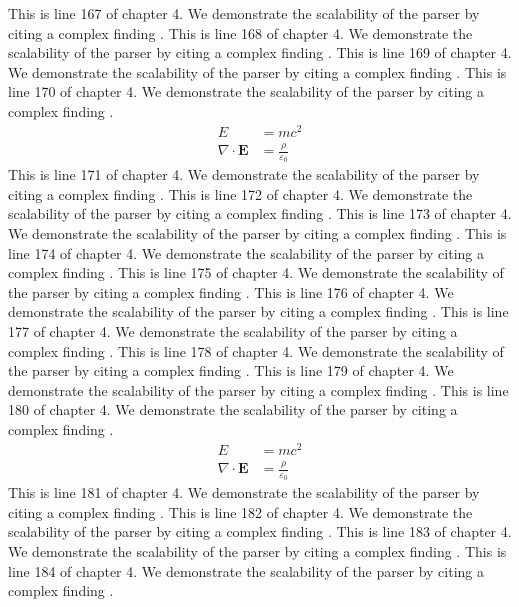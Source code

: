 This is line 167 of chapter 4. We demonstrate the scalability of the parser by citing a complex finding \cite{ref4_167}.
This is line 168 of chapter 4. We demonstrate the scalability of the parser by citing a complex finding \cite{ref4_168}.
This is line 169 of chapter 4. We demonstrate the scalability of the parser by citing a complex finding \cite{ref4_169}.
This is line 170 of chapter 4. We demonstrate the scalability of the parser by citing a complex finding \cite{ref4_170}.
\begin{align*}
  E &= mc^2 \\
  \nabla \cdot \mathbf{E} &= \frac{\rho}{\varepsilon_0}
\end{align*}
This is line 171 of chapter 4. We demonstrate the scalability of the parser by citing a complex finding \cite{ref4_171}.
This is line 172 of chapter 4. We demonstrate the scalability of the parser by citing a complex finding \cite{ref4_172}.
This is line 173 of chapter 4. We demonstrate the scalability of the parser by citing a complex finding \cite{ref4_173}.
This is line 174 of chapter 4. We demonstrate the scalability of the parser by citing a complex finding \cite{ref4_174}.
This is line 175 of chapter 4. We demonstrate the scalability of the parser by citing a complex finding \cite{ref4_175}.
This is line 176 of chapter 4. We demonstrate the scalability of the parser by citing a complex finding \cite{ref4_176}.
This is line 177 of chapter 4. We demonstrate the scalability of the parser by citing a complex finding \cite{ref4_177}.
This is line 178 of chapter 4. We demonstrate the scalability of the parser by citing a complex finding \cite{ref4_178}.
This is line 179 of chapter 4. We demonstrate the scalability of the parser by citing a complex finding \cite{ref4_179}.
This is line 180 of chapter 4. We demonstrate the scalability of the parser by citing a complex finding \cite{ref4_180}.
\begin{align*}
  E &= mc^2 \\
  \nabla \cdot \mathbf{E} &= \frac{\rho}{\varepsilon_0}
\end{align*}
This is line 181 of chapter 4. We demonstrate the scalability of the parser by citing a complex finding \cite{ref4_181}.
This is line 182 of chapter 4. We demonstrate the scalability of the parser by citing a complex finding \cite{ref4_182}.
This is line 183 of chapter 4. We demonstrate the scalability of the parser by citing a complex finding \cite{ref4_183}.
This is line 184 of chapter 4. We demonstrate the scalability of the parser by citing a complex finding \cite{ref4_184}.
